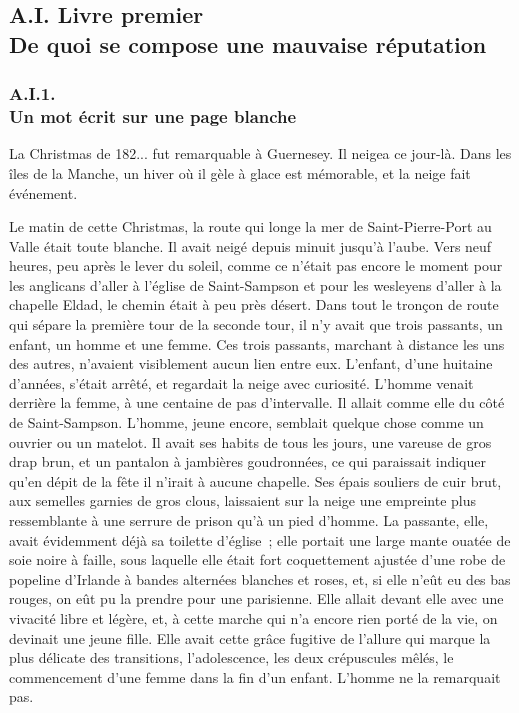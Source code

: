 \documentclass[french,twoside]{book} %
\begin{document}
  \subsection[{A.I. Livre premier. De quoi se compose une mauvaise réputation}]{A.I. Livre premier \\
De quoi se compose une mauvaise réputation}
  \subsubsection[{A.I.1. Un mot écrit sur une page blanche}]{A.I.1. \\
Un mot écrit sur une page blanche}
\noindent La Christmas de 182... fut remarquable à Guernesey. Il neigea ce jour-là. Dans les îles de la Manche, un hiver où il gèle à glace est mémorable, et la neige fait événement.\par
Le matin de cette Christmas, la route qui longe la mer de Saint-Pierre-Port au Valle était toute blanche. Il avait neigé depuis minuit jusqu’à l’aube. Vers neuf heures, peu après le lever du soleil, comme ce n’était pas encore le moment pour les anglicans d’aller à l’église de Saint-Sampson et pour les wesleyens d’aller à la chapelle Eldad, le chemin était à peu près désert. Dans tout le tronçon de route qui sépare la première tour de la seconde tour, il n’y avait que trois passants, un enfant, un homme et une femme. Ces trois passants, marchant à distance les uns des autres,  n’avaient visiblement aucun lien entre eux. L’enfant, d’une huitaine d’années, s’était arrêté, et regardait la neige avec curiosité. L’homme venait derrière la femme, à une centaine de pas d’intervalle. Il allait comme elle du côté de Saint-Sampson. L’homme, jeune encore, semblait quelque chose comme un ouvrier ou un matelot. Il avait ses habits de tous les jours, une vareuse de gros drap brun, et un pantalon à jambières goudronnées, ce qui paraissait indiquer qu’en dépit de la fête il n’irait à aucune chapelle. Ses épais souliers de cuir brut, aux semelles garnies de gros clous, laissaient sur la neige une empreinte plus ressemblante à une serrure de prison qu’à un pied d’homme. La passante, elle, avait évidemment déjà sa toilette d’église ; elle portait une large mante ouatée de soie noire à faille, sous laquelle elle était fort coquettement ajustée d’une robe de popeline d’Irlande à bandes alternées blanches et roses, et, si elle n’eût eu des bas rouges, on eût pu la prendre pour une parisienne. Elle allait devant elle avec une vivacité libre et légère, et, à cette marche qui n’a encore rien porté de la vie, on devinait une jeune fille. Elle avait cette grâce fugitive de l’allure qui marque la plus délicate des transitions, l’adolescence, les deux crépuscules mêlés, le commencement d’une femme dans la fin d’un enfant. L’homme ne la remarquait pas.\par
\end{document}
